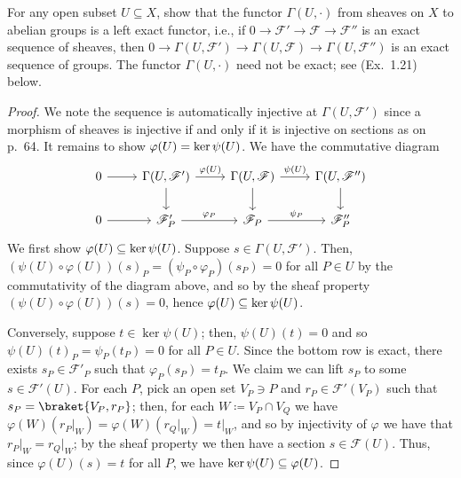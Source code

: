 \documentclass[10pt]{article}
\theoremstyle{definition}
\theoremstyle{remark}
\numberwithin{equation}{section}
\numberwithin{figure}{subsubsection}
\let\Im\relax
\DeclareMathOperator{\Im}{im}
\newcommand{\FF}{\mathscr{F}}
\begin{document}
\begin{problem}
  For any open subset $U \subseteq X$, show that the functor $\Gamma(U,\cdot)$ from sheaves on $X$ to abelian groups is a left exact functor, i.e., if $0 \to \mathscr{F}' \to \mathscr{F} \to \mathscr{F}''$ is an exact sequence of sheaves, then $0 \to \Gamma(U,\mathscr{F}') \to \Gamma(U,\mathscr{F}) \to \Gamma(U,\mathscr{F}'')$ is an exact sequence of groups. The functor $\Gamma(U,\cdot)$ need not be exact; see (Ex.~1.21) below.
\end{problem}
\begin{proof}
  We note the sequence is automatically injective at $\Gamma(U,\FF')$ since a morphism of sheaves is injective if and only if it is injective on sections as on p.~64. It remains to show $\Im\varphi(U) = \ker\psi(U)$. We have the commutative diagram
  \begin{equation*}
    \begin{tikzcd}
      0 \rar & \Gamma(U,\mathscr{F}') \rar{\varphi(U)}\dar & \Gamma(U,\mathscr{F}) \rar{\psi(U)}\dar & \Gamma(U,\mathscr{F}'')\dar\\
      0 \rar & \mathscr{F}'_P \rar{\varphi_P} & \mathscr{F}_P \rar{\psi_P} & \mathscr{F}''_P
    \end{tikzcd}
  \end{equation*}
  We first show $\Im\varphi(U) \subseteq \ker\psi(U)$. Suppose $s \in
  \Gamma(U,\mathscr{F}')$. Then, $(\psi(U) \circ \varphi(U))(s)_P = (\psi_P
  \circ \varphi_P)(s_P) = 0$ for all $P \in U$ by the commutativity of the
  diagram above, and so by the sheaf property $(\psi(U)\circ\varphi(U))(s) = 0$,
  hence $\Im\varphi(U) \subseteq \ker\psi(U)$.
  \par Conversely, suppose $t \in \ker\psi(U)$; then, $\psi(U)(t) = 0$ and so $\psi(U)(t)_P = \psi_P(t_P) = 0$ for all $P \in U$. Since the bottom row is exact, there exists $s_P \in \mathscr{F}'_P$ such that $\varphi_P(s_P) = t_P$. We claim we can lift $s_P$ to some $s \in \mathscr{F}'(U)$. For each $P$, pick an open set $V_P \ni P$ and $r_P \in \mathscr{F}'(V_P)$ such that $s_P = \braket{V_P,r_P}$; then, for each $W \coloneqq V_P \cap V_Q$ we have $\varphi(W)(r_P\vert_W) = \varphi(W)(r_Q\vert_W) = t\vert_W$, and so by injectivity of $\varphi$ we have that $r_P\vert_W = r_Q\vert_W$; by the sheaf property we then have a section $s \in \mathscr{F}(U)$. Thus, since $\varphi(U)(s) = t$ for all $P$, we have $\ker\psi(U) \subseteq \Im\varphi(U)$.
\end{proof}
\end{document}
